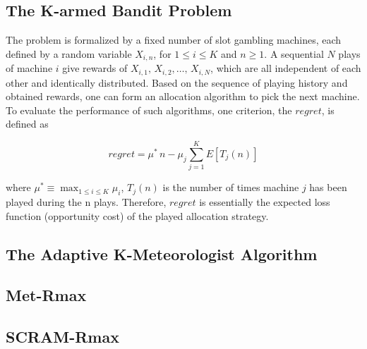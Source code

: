\documentclass[conference]{IEEEtran}
\begin{document}
\subsection{The K-armed Bandit Problem}
The problem is formalized by a fixed number of slot gambling machines, each defined by a random variable $X_{i,n}$, for $1\leq i \leq K$ and $n \geq 1$. A sequential $N$ plays of machine $i$ give rewards of $X_{i,1},\,X_{i,2},\dots,\, X_{i,N}$, which are all independent of each other and identically distributed. Based on the sequence of playing history and obtained rewards, one can form an allocation algorithm to pick the next machine. To evaluate the performance of such algorithms, one criterion, the $regret$, is defined as

\begin{equation*}
	regret = \mu^{*}\,n - \mu_j \sum_{j=1}^K E[T_j(n)]
\end{equation*}

where $\mu^{*} \equiv \max_{1\leq i \leq K} \mu_i$, $T_j(n)$ is the number of times machine $j$ has been played during the n plays. Therefore, $regret$ is essentially the expected loss function (opportunity cost) of the played allocation strategy.

\subsection{The Adaptive K-Meteorologist Algorithm}

\subsection{Met-Rmax}

\subsection{SCRAM-Rmax}


\end{document}
